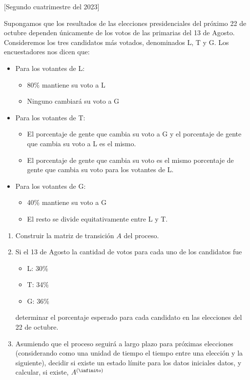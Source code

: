 \begin{enunciado}{\ejExtra}
  {\tiny[Segundo cuatrimestre del 2023]}

  Supongamos que los resultados de las elecciones presidenciales del próximo 22 de octubre dependen únicamente de los votos de las primarias del
  13 de Agosto. Consideremos los tres candidatos más votados, denominados L, T y G.
  Los encuestadores nos dicen que:
  \begin{itemize}
    \item Para los votantes de L:
          \begin{itemize}
            \item 80\% mantiene su voto a L
            \item Ninguno cambiará su voto a G
          \end{itemize}

    \item Para los votantes de T:
          \begin{itemize}
            \item El porcentaje de gente que cambia su voto a G y el porcentaje de gente que cambia su voto a L es el mismo.
            \item El porcentaje de gente que cambia su voto es el mismo porcentaje de gente que cambia su voto para los
                  votantes de L.
          \end{itemize}

    \item Para los votantes de G:
          \begin{itemize}
            \item 40\% mantiene su voto a G
            \item El resto se divide equitativamente entre L y T.
          \end{itemize}
  \end{itemize}
  \begin{enumerate}[label=(\alph*)]
    \item Construir la matriz de transición $A$ del proceso.
    \item Si el 13 de Agosto la cantidad de votos para cada uno de los candidatos fue
          \begin{itemize}
            \item L: 30\%
            \item T: 34\%
            \item G: 36\%
          \end{itemize}
          determinar el porcentaje esperado para cada candidato en las elecciones del 22 de octubre.
    \item Asumiendo que el proceso seguirá a largo plazo para próximas elecciones
          (considerando como una unidad de tiempo el tiempo entre una elección y la siguiente),
          decidir si existe un estado límite para los datos iniciales datos, y calcular, si existe, $A^{(\infinito)}$
  \end{enumerate}
\end{enunciado}

